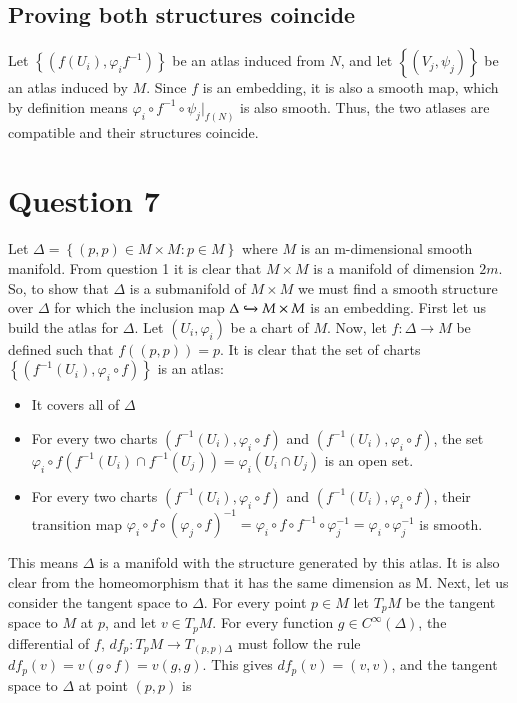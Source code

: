 \documentclass{article}
\begin{document}
\subsection*{Proving both structures coincide}
Let $\left\{\left(f(U_i), \varphi_i f^{-1}\right)\right\}$ be an atlas induced from $N$, and let $\left\{\left(V_j, \psi_j\right)\right\}$ be an atlas induced by $M$. Since $f$ is an embedding, it is also a smooth map, which by definition means $\varphi_i \circ f^{-1} \circ \psi_j|_{f(N)}$ is also smooth. Thus, the two atlases are compatible and their structures coincide.

\section*{Question 7}
Let $\Delta = \left\{(p,p)\in M \times M : p \in M\right\}$ where $M$ is an m-dimensional smooth manifold. From question 1 it is clear that $M \times M$ is a manifold of dimension $2m$. So, to show that $\Delta$ is a submanifold of $M \times M$ we must find a smooth structure over $\Delta$ for which the inclusion map $\Delta \xhookrightarrow {} M \times M$ is an embedding.
\newline
First let us build the atlas for $\Delta$. Let $\left(U_i, \varphi_i\right)$ be a chart of $M$. Now, let $f: \Delta \rightarrow M$ be defined such that $f((p,p)) = p$. It is clear that the set of charts $\left\{\left(f^{-1}(U_i), \varphi_i\circ f\right)\right\}$ is an atlas:
\begin{itemize}
    \item It covers all of $\Delta$
    \item For every two charts $\left(f^{-1}(U_i), \varphi_i\circ f\right)$ and $\left(f^{-1}(U_i), \varphi_i\circ f\right)$, the set $\varphi_i\circ f \left(f^{-1}(U_i) \cap f^{-1}(U_j)\right) = \varphi_i \left(U_i \cap U_j\right)$ is an open set.
    \item For every two charts $\left(f^{-1}(U_i), \varphi_i\circ f\right)$ and $\left(f^{-1}(U_i), \varphi_i\circ f\right)$, their transition map $\varphi_i \circ f \circ \left(\varphi_j \circ f\right)^{-1} = \varphi_i \circ f \circ f^{-1} \circ \varphi_j^{-1} = \varphi_i \circ \varphi_j^{-1}$ is smooth.
\end{itemize}
This means $\Delta$ is a manifold with the structure generated by this atlas. It is also clear from the homeomorphism that it has the same dimension as M.
\newline
Next, let us consider the tangent space to $\Delta$. For every point $p \in M$ let $T_pM$ be the tangent space to $M$ at $p$, and let $v \in T_pM$. For every function $g \in C^{\infty}(\Delta)$, the differential of $f$, $df_p: T_p M \rightarrow T_{(p,p)\Delta}$ must follow the rule $df_p(v) = v(g \circ f) = v(g,g)$. This gives $df_p(v) = (v,v)$, and the tangent space to $\Delta$ at point $(p,p)$ is
\end{document}
